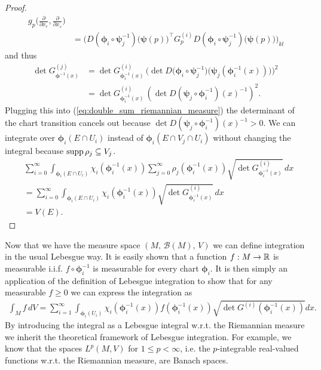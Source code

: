\documentclass[../master_thesis.tex]{subfiles}
\begin{document}
\begin{proof}
\begin{align*}
            \, g_p\Big(\frac{\partial}{\partial x_r}, \frac{\partial}{\partial x_s}\Big)
        \\ &= \bigg( D(\boldsymbol{\phi}_i 
            \circ \boldsymbol{\psi}_j^{-1})\big(\boldsymbol{\psi}(p)\big)^\top 
            G^{(i)}_p D(\boldsymbol{\phi}_i \circ \boldsymbol{\psi}_j^{-1})\big(\boldsymbol{\psi}(p)\big)\bigg)_{kl}
    \end{align*}
    and thus 
    \begin{align*}
        \det G^{(j)}_{\boldsymbol{\phi}^{-1}(x)} 
        &= \det G^{(i)}_{\boldsymbol{\phi}_i^{-1}(x)} \,
            \bigg(\det D\big(\boldsymbol{\phi}_i 
            \circ \boldsymbol{\psi}_j^{-1}\big)\big(\boldsymbol{\psi}_j(\boldsymbol{\phi}_i^{-1}(x))\big)\bigg)^2
        \\ &= \det G^{(i)}_{\boldsymbol{\phi}_i^{-1}(x)} \,
            \left( \det D(\boldsymbol{\psi}_j \circ \bm{\phi}_i^{-1})(x)^{-1}\right)^2.
    \end{align*}
    Plugging this into (\ref{eq:double_sum_riemannian_measure}) the determinant 
    of the chart transition cancels out because $\det D(\boldsymbol{\psi}_j \circ \boldsymbol{\phi}_i^{-1})(x)^{-1} > 0$.
    We can integrate over $\boldsymbol{\phi}_i(E \cap U_i)$ 
    instead of $\boldsymbol{\phi}_i(E \cap V_j \cap U_i)$ without changing the integral 
    because $\operatorname{supp} \rho_j \subseteq V_j$.
    \begin{align*}
        &\sum_{i=0}^\infty \int_{\boldsymbol{\phi}_i(E \cap U_i)} \chi_i(\boldsymbol{\phi}_i^{-1}(x))\sum_{j=0}^\infty \rho_j(\boldsymbol{\phi}_i^{-1}(x))
            \sqrt{\det G^{(i)}_{\boldsymbol{\phi}_i^{-1}(x)}} \, dx
        \\ &= \sum_{i=0}^\infty \int_{\boldsymbol{\phi}_i(E \cap U_i)} \chi_i(\boldsymbol{\phi}_i^{-1}(x))
             \sqrt{\det G^{(i)}_{\boldsymbol{\phi}_i^{-1}(x)}} \, dx
        \\ &= V(E).
    \end{align*}
\end{proof}


Now that we have the measure space $(M, \, \mathcal{B}(M), \, V)$
we can define integration in the usual Lebesgue way.
It is easily shown that a function $f: M \rightarrow \mathbb{R}$ is measurable 
i.i.f. $f \circ \boldsymbol{\phi}_i^{-1}$ is measurable for every chart $\boldsymbol{\phi}_i$. 
It is then simply an application of the definition of Lebesgue integration to
show that for any measurable $f \geq 0$ we can express the integration as
\begin{align*}
    \int_M f \, dV = \sum\limits_{i=1}^\infty \int_{\boldsymbol{\phi}_i(U_i)} 
        \chi_i(\boldsymbol{\phi}_i^{-1}(x)) f(\boldsymbol{\phi}_i^{-1}(x)) 
        \sqrt{\det G^{(i)}(\boldsymbol{\phi}_i^{-1}(x))} dx.
\end{align*}
By introducing the integral as a Lebesgue integral w.r.t. the Riemannian 
measure we inherit the theoretical framework of Lebesgue integration. 
For example, we know that the spaces $L^p(M,V)$ for $1\leq p < \infty$,
i.e. the $p$-integrable 
real-valued functions w.r.t. the Riemannian measure, are Banach spaces.
\end{document}
